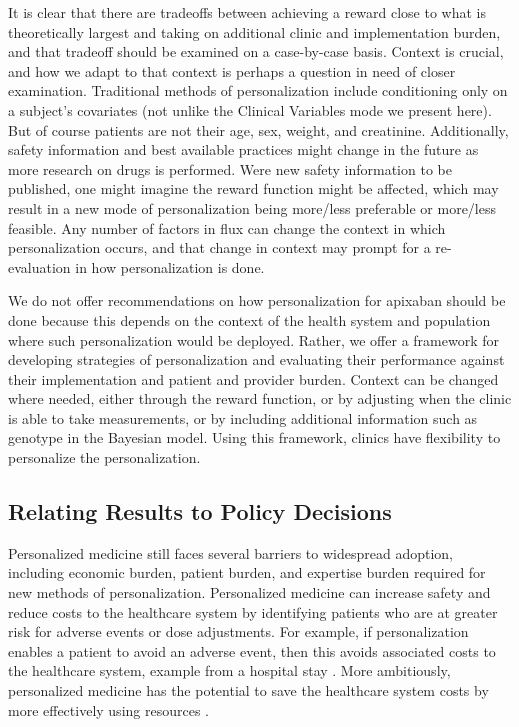 It is clear that there are tradeoffs between achieving a reward close to what is theoretically largest and taking on additional clinic and implementation burden, and that tradeoff should be examined on a case-by-case basis.  Context is crucial, and how we adapt to that context is perhaps a question in need of closer examination.  Traditional methods of personalization include conditioning only on a subject’s covariates (not unlike the Clinical Variables mode we present here).  But of course patients are not their age, sex, weight, and creatinine.  Additionally, safety information and best available practices might change in the future as more research on drugs is performed. Were new safety information to be published, one might imagine the reward function might be affected, which may result in a new mode of personalization being more/less preferable or more/less feasible.  Any number of factors in flux can change the context in which personalization occurs, and that change in context may prompt for a re-evaluation in how personalization is done.

We do not offer recommendations on how personalization for apixaban should be done because this depends on the context of the health system and population where such personalization would be deployed. Rather, we offer  a framework for developing strategies of personalization and evaluating their performance against their implementation and patient and provider burden.  Context can be changed where needed, either through the reward function, or by adjusting when the clinic is able to take measurements, or by including additional information such as genotype in the Bayesian model.  Using this framework, clinics have flexibility to personalize the personalization.


\subsection{Relating Results to Policy Decisions}

Personalized medicine still faces several barriers to widespread adoption, including economic burden, patient burden, and expertise burden required for new methods of personalization.
Personalized medicine can increase safety and reduce costs to the healthcare system by identifying patients who are at greater risk for adverse events or dose adjustments.  For example, if personalization enables a patient to avoid an adverse event, then this avoids associated costs to the healthcare system, example from a hospital stay \cite{looff2016economic}.  More ambitiously, personalized medicine has the potential to save the healthcare system costs by more effectively using resources \cite{shabaruddin2015economic}. 

